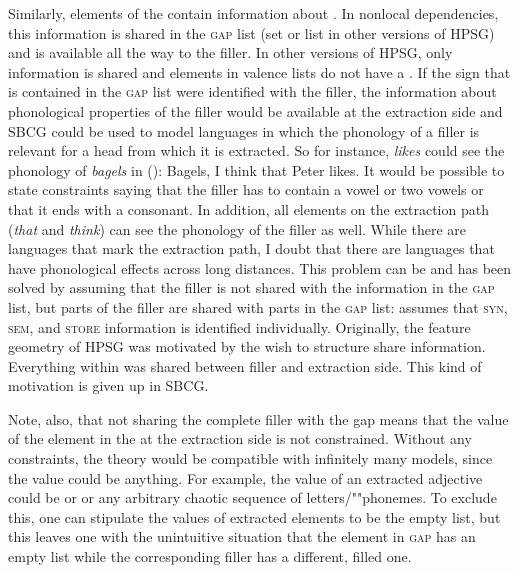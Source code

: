 \documentclass[output=paper
	        ,collection
	        ,collectionchapter
 	        ,biblatex
                ,babelshorthands
                ,newtxmath
                ,draftmode
                ,colorlinks, citecolor=brown
]{langscibook}
\begin{document}
Similarly, elements of the \argstl contain information about \form. In nonlocal dependencies, this
information is shared in the \textsc{gap} list (\slasch set or list in other versions of
HPSG) and is available all the way to the filler. In other versions of HPSG, only \local information is shared and elements in valence lists
do not have a \phonf. If the sign that is contained in the \textsc{gap} list were identified with
the filler, the information about phonological properties of the filler would be available at the
extraction side and SBCG could be used to model languages in which the phonology of
a filler is relevant for a head from which it is extracted. So for instance, \emph{likes} could see the
phonology of \emph{bagels} in ():
\ea
Bagels, I think that Peter likes.
\z
It would be possible to state constraints saying that the filler has to contain a vowel or two
vowels or that it ends with a consonant. In addition, all elements on the extraction path
(\emph{that} and \emph{think}) can see the phonology of the filler as well. While there are
languages that mark the extraction path, I doubt that there are languages that have phonological
effects across long distances. This problem can be and has been solved by assuming that the
filler is not shared with the information in the \textsc{gap} list, but parts of the filler are
shared with parts in the \textsc{gap} list: \citet[]{Sag2012a} assumes that \textsc{syn},
\textsc{sem}, and \textsc{store} information is identified individually. Originally, the feature
geometry of HPSG was motivated by the wish to structure share information. Everything within \local
was shared between filler and extraction side. This kind of motivation is given up in SBCG.

Note, also, that not sharing the complete filler with the gap means that the \form
value of the element in the \argstl at the extraction side is not constrained. Without any
constraints, the theory would be compatible with infinitely many models, since the \form value could be
anything. For example, the \form value of an extracted adjective could be 
or  or any arbitrary chaotic sequence of letters/""phonemes. To exclude this, one can stipulate the \form values of extracted
elements to be the empty list, but this leaves one with the unintuitive situation that the element
in \textsc{gap} has an empty \form list while the corresponding filler has a different, filled one.


\label{sec-frame-semantics-SBCG}
\end{document}
